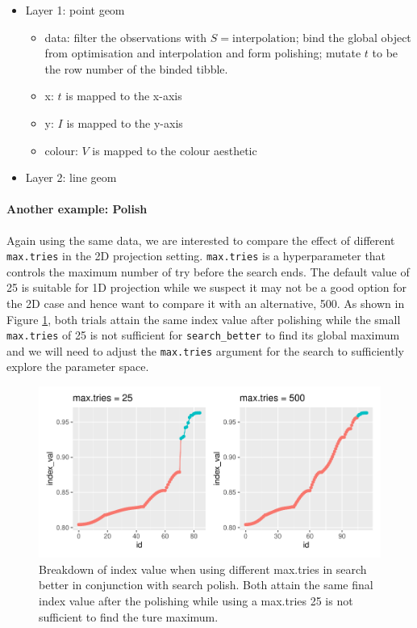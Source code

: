 \documentclass[12pt]{article}
\providecommand{\tightlist}{%
  \setlength{\itemsep}{0pt}\setlength{\parskip}{0pt}}
\begin{document}
\begin{itemize}
\tightlist
\item
  Layer 1: point geom

  \begin{itemize}
  \tightlist
  \item
    data: filter the observations with \(S = \text{interpolation}\);
    bind the global object from optimisation and interpolation and form
    polishing; mutate \(t\) to be the row number of the binded tibble.
  \item
    x: \(t\) is mapped to the x-axis
  \item
    y: \(I\) is mapped to the y-axis
  \item
    colour: \(V\) is mapped to the colour aesthetic
  \end{itemize}
\item
  Layer 2: line geom
\end{itemize}

\hypertarget{another-example-polish}{%
\paragraph{Another example: Polish}\label{another-example-polish}}

Again using the same data, we are interested to compare the effect of
different \texttt{max.tries} in the 2D projection setting.
\texttt{max.tries} is a hyperparameter that controls the maximum number
of try before the search ends. The default value of 25 is suitable for
1D projection while we suspect it may not be a good option for the 2D
case and hence want to compare it with an alternative, 500. As shown in
Figure \ref{trace-compare}, both trials attain the same index value
after polishing while the small \texttt{max.tries} of 25 is not
sufficient for \texttt{search\_better} to find its global maximum and we
will need to adjust the \texttt{max.tries} argument for the search to
sufficiently explore the parameter space.

\begin{figure}
\centering
\includegraphics{paper_files/figure-latex/polish-1.pdf}
\caption{\label{trace-compare}Breakdown of index value when using
different max.tries in search better in conjunction with search polish.
Both attain the same final index value after the polishing while using a
max.tries 25 is not sufficient to find the ture maximum.}
\end{figure}
\end{document}
